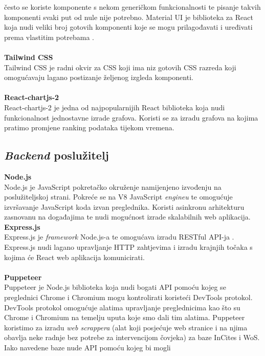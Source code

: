 \documentclass[times, utf8, zavrsni]{fer}
\begin{document}
često se koriste komponente s nekom generičkom funkcionalnosti te pisanje takvih komponenti svaki put od nule nije potrebno. 
Material UI je biblioteka za React koja nudi veliki broj gotovih komponenti koje se mogu prilagođavati i uređivati prema vlastitim potrebama .
\\
\\ \textbf{Tailwind CSS}
\\ Tailwind CSS je radni okvir  za CSS  koji ima niz gotovih CSS razreda koji omogućavaju lagano postizanje 
željenog izgleda komponenti.
\\
\\ \textbf{React-chartjs-2}
\\ React-chartjs-2 je jedna od najpopularnijih React biblioteka koja nudi funkcionalnost jednostavne izrade grafova. Koristi se za izradu grafova na 
kojima pratimo promjene ranking podataka tijekom vremena.
\\ \subsection{\emph{Backend} poslužitelj}
\textbf{Node.js} 
\\ Node.js je JavaScript pokretačko okruženje  namijenjeno izvođenju na poslužiteljskoj strani. Pokreće se na V8 JavaScript \emph{engineu}
te omogućuje izvršavanje JavaScript koda izvan preglednika. Koristi asinkronu arhitekturu zasnovanu na događajima 
te nudi mogućnost izrade skalabilnih web aplikacija.\\\newpage \textbf{Express.js}
\\ Express.js je \emph{framework} Node.js-a te omogućava izradu RESTful API-ja . Express.js nudi
lagano upravljanje HTTP zahtjevima i izradu krajnjih točaka  s kojima će React web aplikacija komunicirati.
\\ \\ \textbf{Puppeteer}
\\ Puppeteer je Node.js biblioteka koja nudi bogati API pomoću kojeg se preglednici Chrome i Chromium mogu kontrolirati koristeći DevTools protokol.
DevTools protokol omogućuje alatima upravljanje preglednicima kao što su Chrome i Chromium na temelju uputa koje smo dali tim alatima.
Puppeteer koristimo za izradu \emph{web scrappera} (alat koji posjećuje web stranice i 
na njima obavlja neke radnje bez potrebe za intervencijom čovjeka) za baze InCites i WoS. Iako navedene baze nude API pomoću kojeg bi mogli 
\end{document}
